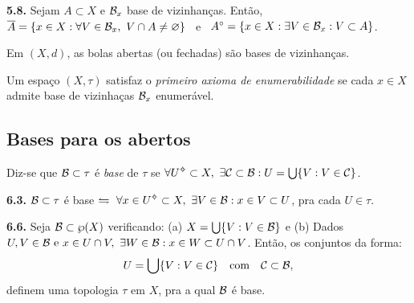 \hypertarget{prop58}{}
\begin{proposition}
    \textbf{5.8.} Sejam \(A \subset X\) e \(\mathcal{B}_x\) base de vizinhanças. Então, \(\overline{A} = \{x \in X : \forall V \in \mathcal{B}_x, \ V\cap A \neq \varnothing\}\) \ e \ \(A^\circ = \{x \in X : \exists  V \in \mathcal{B}_x : V\subset A\}\).
\end{proposition}

\begin{example}
    Em \((X, d)\), as bolas abertas (ou fechadas) são bases de vizinhanças. 
\end{example}
\begin{definition}[AN1]
    Um espaço \((X, \tau)\) satisfaz o \emph{primeiro axioma de enumerabilidade} se cada \( x \in X\) admite base de vizinhaças \(\mathcal{B}_x\) enumerável.  
\end{definition}

\subsection*{Bases para os abertos}

\begin{definition}
    Diz-se que \(\mathcal{B} \subset \tau\) é \emph{base} de \(\tau \) se \(\forall U \ab \subset X, \ \exists \mathcal{C} \subset \B : U = \bigcup \{V : V \in \mathcal{C}\}\). 
\end{definition}

\begin{proposition}
    \textbf{6.3.} \(\mathcal{B} \subset \tau\) é base \(\leftrightharpoons \ \forall x \in U\ab\subset X, \  \exists V \in \B : x \in V \subset U\), pra cada \( U \in \tau \). 
\end{proposition}

\hypertarget{prop66}{}
\begin{proposition}
    \textbf{6.6.} Seja \(\mathcal{B} \subset \wp(X)\) verificando: (a) \(X = \bigcup\{V : V \in \mathcal{B}\}\) e (b) Dados \(U, V \in \mathcal{B} \text{ e } x \in U \cap V, \ \exists W \in \mathcal{B} : x \in W \subset U \cap V \). Então, os conjuntos da forma:  
    \[U = \bigcup \{V : V \in \mathcal{C}\} \text{ \ \ com \ \ } \mathcal{C} \subset \mathcal{B},\]
    definem uma topologia \(\tau\) em \( X\), pra a qual \(\mathcal{B}\) é base. 
\end{proposition}

\ejemplo{%
\begin{example}
    {\scriptsize \(\bullet\)} \ \(\B = \{(a, \infty) : a \in \R\}\) \hfill \(\mid \) \hfill{\scriptsize \(\bullet\)} \ \(\B :=\{[a,b): a <b\}\) (top. Sorgenfrey) 
\end{example}
}

